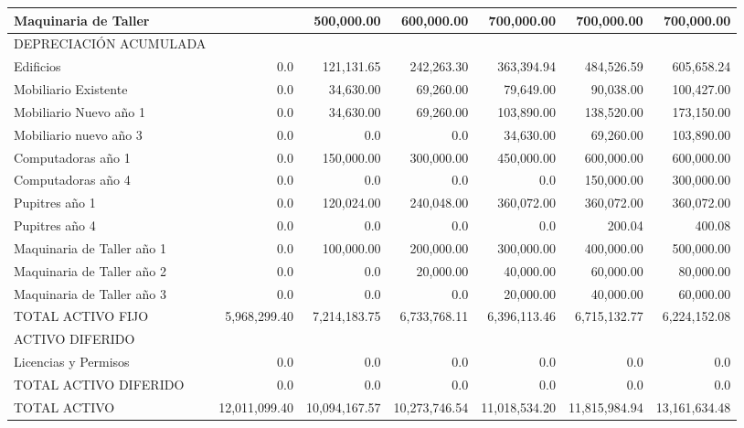 \begin{table}
\begin{tabular}{@{\hspace{1mm}}l@{\hspace{1mm}}*{6}{|@{\hspace{1mm}}r@{\hspace{1mm}}}}
    Maquinaria de Taller             &		&	 500,000.00 	&	 600,000.00 	&	 700,000.00 	&	 700,000.00 	&	 700,000.00  \\
    \hline
    DEPRECIACIÓN ACUMULADA           &		&		&		&		&		&	 \\
    \hline
    Edificios                        &	 0.0 	&	 121,131.65 	&	 242,263.30 	&	 363,394.94 	&	 484,526.59 	&	 605,658.24  \\
    Mobiliario Existente             &	 0.0 	&	 34,630.00 	&	 69,260.00 	&	 79,649.00 	&	 90,038.00 	&	 100,427.00  \\
    Mobiliario Nuevo año 1           &	 0.0 	&	 34,630.00 	&	 69,260.00 	&	 103,890.00 	&	 138,520.00 	&	 173,150.00  \\
    Mobiliario nuevo año 3           &	 0.0 	&	 0.0 	&	 0.0 	&	 34,630.00 	&	 69,260.00 	&	 103,890.00  \\
    Computadoras año 1               &	 0.0 	&	 150,000.00 	&	 300,000.00 	&	 450,000.00 	&	 600,000.00 	&	 600,000.00  \\
    Computadoras año 4               &	 0.0 	&	 0.0 	&	 0.0 	&	 0.0 	&	 150,000.00 	&	 300,000.00  \\
    Pupitres año 1                   &	 0.0 	&	 120,024.00 	&	 240,048.00 	&	 360,072.00 	&	 360,072.00 	&	 360,072.00  \\
    Pupitres año 4                   &	 0.0 	&	 0.0 	&	 0.0 	&	 0.0 	&	 200.04 	&	 400.08  \\
    Maquinaria de Taller año 1       &	 0.0 	&	 100,000.00 	&	 200,000.00 	&	 300,000.00 	&	 400,000.00 	&	 500,000.00  \\
    Maquinaria de Taller año 2       &	 0.0 	&	 0.0 	&	 20,000.00 	&	 40,000.00 	&	 60,000.00 	&	 80,000.00  \\
    Maquinaria de Taller año 3       &	 0.0 	&	 0.0 	&	 0.0 	&	 20,000.00 	&	 40,000.00 	&	 60,000.00  \\
    \hline
    TOTAL ACTIVO FIJO                &	 5,968,299.40 	&	 7,214,183.75 	&	 6,733,768.11 	&	 6,396,113.46 	&	 6,715,132.77 	&	 6,224,152.08  \\
    \hline
    ACTIVO DIFERIDO                  &		&		&		&		&		&	 \\
    \hline
    Licencias y Permisos             &	 0.0 	&	 0.0 	&	 0.0 	&	 0.0 	&	 0.0 	&	 0.0  \\
    \hline
    TOTAL ACTIVO DIFERIDO            &	 0.0 	&	 0.0 	&	 0.0 	&	 0.0 	&	 0.0 	&	 0.0  \\
    \hline
    \hline
    TOTAL ACTIVO                     &	 12,011,099.40 	&	 10,094,167.57 	&	 10,273,746.54 	&	 11,018,534.20 	&	 11,815,984.94 	&	 13,161,634.48  \\

\end{tabular}
\end{table}
